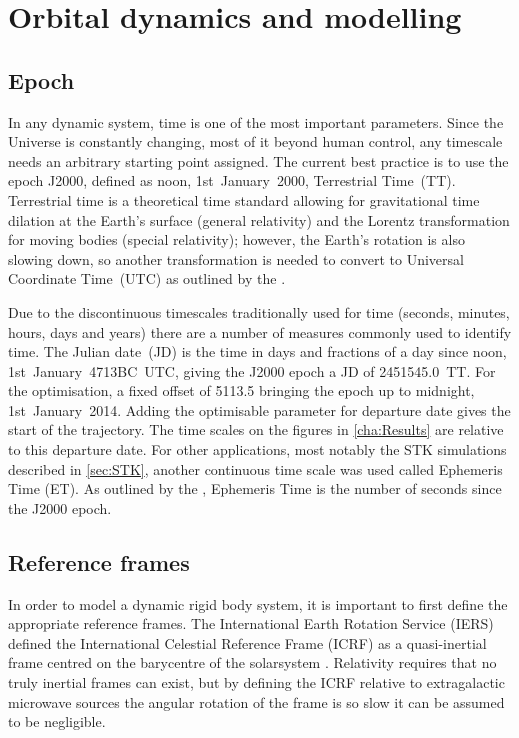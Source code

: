 \chapter{Orbital dynamics and modelling} \label{cha:Orbital-dynamics-and-modelling}

\section{Epoch} \label{sec:Epoch}

In any dynamic system, time is one of the most important parameters. Since the Universe is constantly changing, most of it beyond human control, any timescale needs an arbitrary starting point assigned. The current best practice is to use the epoch J2000, defined as noon, 1st~January~2000, Terrestrial Time~(TT). Terrestrial time is a theoretical time standard allowing for gravitational time dilation at the Earth's surface (general relativity) and the Lorentz transformation for moving bodies (special relativity); however, the Earth's rotation is also slowing down, so another transformation is needed to convert to Universal Coordinate Time~(UTC) as outlined by the \textcite[USNO, ][]{web_TimeServiceDept.2008}.

Due to the discontinuous timescales traditionally used for time (seconds, minutes, hours, days and years) there are a number of measures commonly used to identify time. The Julian date~(JD) is the time in days and fractions of a day since noon, 1st~January~4713BC~UTC, giving the J2000 epoch a JD of 2451545.0~TT. For the optimisation, a fixed offset of 5113.5 bringing the epoch up to midnight, 1st~January~2014. Adding the optimisable parameter for departure date gives the start of the trajectory. The time scales on the figures in \autoref{cha:Results} are relative to this departure date. For other applications, most notably the STK simulations described in \autoref{sec:STK}, another continuous time scale was used called Ephemeris Time (ET). As outlined by the \textcite{NAIF2010}, Ephemeris Time is the number of seconds since the J2000 epoch.




\section{Reference frames} \label{sec:Reference-frames}

In order to model a dynamic rigid body system, it is important to first define the appropriate reference frames. The International Earth Rotation Service (IERS) defined the International Celestial Reference Frame (ICRF) as a quasi-inertial frame centred on the barycentre of the solarsystem \parencite{Ma1998}. %
Relativity requires that no truly inertial frames can exist, but by defining the ICRF relative to extragalactic microwave sources the angular rotation of the frame is so slow it can be assumed to be negligible.

